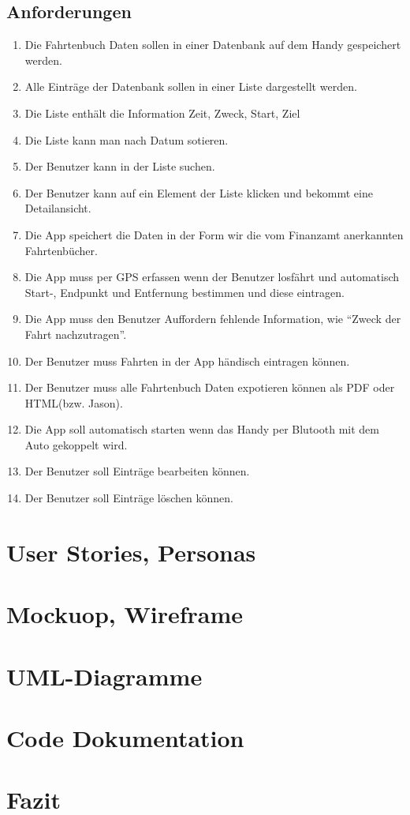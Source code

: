 \documentclass[a4paper]{article}
\begin{document}
\subsection{Anforderungen}
\begin{enumerate}
	\item Die Fahrtenbuch Daten sollen in einer Datenbank auf dem Handy gespeichert werden.
	\item Alle Einträge der Datenbank sollen in einer Liste dargestellt werden.
	\item Die Liste enthält die Information Zeit, Zweck, Start, Ziel
	\item Die Liste kann man nach Datum sotieren.
	\item Der Benutzer kann in der Liste suchen.
	\item Der Benutzer kann auf ein Element der Liste klicken und bekommt eine Detailansicht.
	\item Die App speichert die Daten in der Form wir die vom Finanzamt anerkannten Fahrtenbücher.
	\item Die App muss per GPS erfassen wenn der Benutzer losfährt und automatisch Start-, Endpunkt und Entfernung bestimmen und diese eintragen.
	\item Die App muss den Benutzer Auffordern fehlende Information, wie \enquote{Zweck der Fahrt nachzutragen}.
	\item Der Benutzer muss Fahrten in der App händisch eintragen können.
	\item Der Benutzer muss alle Fahrtenbuch Daten expotieren können als PDF oder HTML(bzw. Jason).
	\item Die App soll automatisch starten wenn das Handy per Blutooth mit dem Auto gekoppelt wird.
	\item Der Benutzer soll Einträge bearbeiten können.
	\item Der Benutzer soll Einträge löschen können.
\end{enumerate}

\section{User Stories, Personas}

\section{Mockuop, Wireframe}

\section{UML-Diagramme}

\section{Code Dokumentation}

\section{Fazit}
\end{document}
